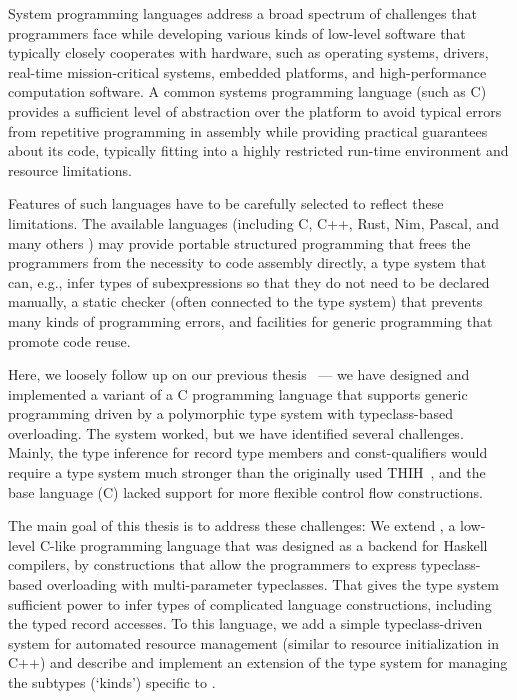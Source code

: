 
System programming languages address a broad spectrum of challenges that programmers face while developing various kinds of low-level software that typically closely cooperates with hardware, such as operating systems, drivers, real-time mission-critical systems, embedded platforms, and high-performance computation software.
A common systems programming language (such as C) provides a sufficient level of abstraction over the platform to avoid typical errors from repetitive programming in assembly while providing practical guarantees about its code, typically fitting into a highly restricted run-time environment and resource limitations.

Features of such languages have to be carefully selected to reflect these limitations.
The available languages (including C, C++, Rust, Nim, Pascal, and many others \cite{stroustrup1999overview,matsakis2014rust,picheta2017nim,sammet1971brief}) may provide portable structured programming that frees the programmers from the necessity to code assembly directly, a type system that can, e.g., infer types of subexpressions so that they do not need to be declared manually, a static checker (often connected to the type system) that prevents many kinds of programming errors, and facilities for generic programming that promote code reuse.

Here, we loosely follow up on our previous thesis~\cite{klepl2020type} --- we have designed and implemented a variant of a C programming language that supports generic programming driven by a polymorphic type system with typeclass-based overloading.
The system worked, but we have identified several challenges.
Mainly, the type inference for record type members and const-qualifiers would require a type system much stronger than the originally used THIH~\cite{jones1999typing}, and the base language (C) lacked support for more flexible control flow constructions.

The main goal of this thesis is to address these challenges: We extend \cmm, a low-level C-like programming language that was designed as a backend for Haskell compilers, by constructions that allow the programmers to express typeclass-based overloading with multi-parameter typeclasses. That gives the type system sufficient power to infer types of complicated language constructions, including the typed record accesses. To this language, we add a simple typeclass-driven system for automated resource management (similar to resource initialization in C++) and describe and implement an extension of the type system for managing the subtypes (`kinds') specific to \cmm.

